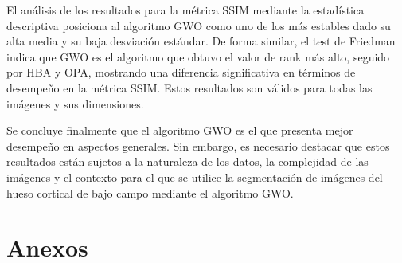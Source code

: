 \documentclass[conference]{IEEEtran}
\begin{document}
\noindent El análisis de los resultados para la métrica SSIM mediante la estadística descriptiva posiciona al algoritmo GWO como uno de los más estables dado su alta media y su baja desviación estándar. De forma similar, el test de Friedman indica que GWO es el algoritmo que obtuvo el valor de rank más alto, seguido por HBA y OPA, mostrando una diferencia significativa en términos de desempeño en la métrica SSIM. Estos resultados son válidos para todas las imágenes y sus dimensiones.

\noindent Se concluye finalmente que el algoritmo GWO es el que presenta mejor desempeño en aspectos generales. Sin embargo, es necesario destacar que estos resultados están sujetos a la naturaleza de los datos, la complejidad de las imágenes y el contexto para el que se utilice la segmentación de imágenes del hueso cortical de bajo campo mediante el algoritmo GWO.






 


\clearpage
\section{Anexos}
\end{document}

